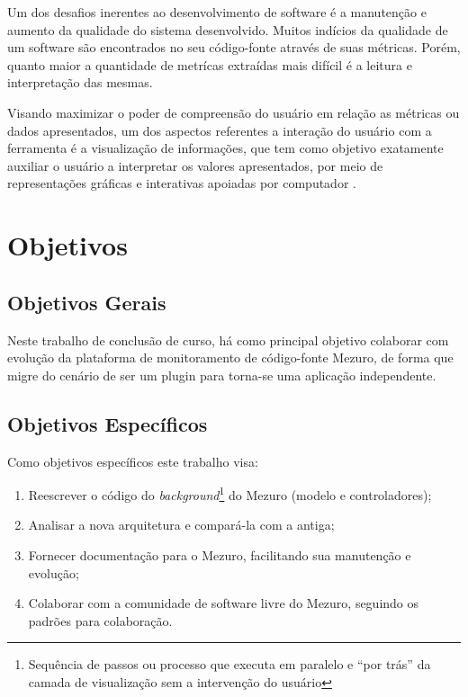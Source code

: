 Um dos desafios inerentes ao desenvolvimento de software é a manutenção e aumento da qualidade do sistema desenvolvido. Muitos indícios da qualidade de um software são encontrados no seu código-fonte através de suas métricas. Porém, quanto maior a quantidade de metrícas extraídas mais difícil é a leitura e interpretação das mesmas.

Visando maximizar o poder de compreensão do usuário em relação as métricas ou dados apresentados, um dos aspectos referentes a interação do usuário com a ferramenta é a visualização de informações, que tem como objetivo exatamente auxiliar o usuário a interpretar os valores apresentados, por meio de representações gráficas e interativas apoiadas por computador \cite{rafaelmessiasmartins2012}.

\section{Objetivos}

\subsection{Objetivos Gerais}

Neste trabalho de conclusão de curso, há como principal objetivo colaborar com evolução da plataforma de monitoramento de código-fonte Mezuro, de forma que migre do cenário de ser um plugin para torna-se uma aplicação independente.

\subsection{Objetivos Específicos}

Como objetivos específicos este trabalho visa:

\begin{enumerate}
\item Reescrever o código do \textit{background}\footnote{Sequência de passos ou processo que executa em paralelo e ``por trás'' da camada de visualização sem a intervenção do usuário} do Mezuro (modelo e controladores);
\item Analisar a nova arquitetura e compará-la com a antiga;
\item Fornecer documentação para o Mezuro, facilitando sua manutenção e evolução;
\item Colaborar com a comunidade de software livre do Mezuro, seguindo os padrões para colaboração.
\end{enumerate}

